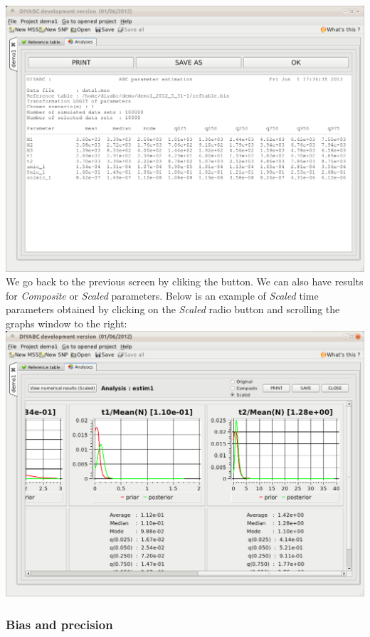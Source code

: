 \includegraphics[scale=0.35]{gui_pictures/Capture-DIYABC-41} \\


We go back to the previous screen by cliking the 
button. \newpage{}We can also have results for \emph{Composite} or
\emph{Scaled} parameters. Below is an example of \emph{Scaled} time
parameters obtained by clicking on the \emph{Scaled} radio button
and scrolling the graphs window to the right:\\


\includegraphics[scale=0.35]{gui_pictures/Capture-DIYABC-42} \\



\subsubsection{Bias and precision}

